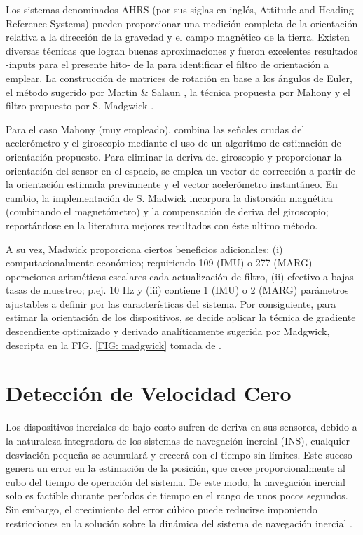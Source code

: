Los sistemas denominados \gls{AHRS} (por sus siglas en inglés, Attitude and Heading Reference Systems) pueden proporcionar una medición completa de la orientación relativa a la dirección de la gravedad y el campo magnético de la tierra. Existen diversas técnicas que logran buenas aproximaciones y fueron excelentes resultados -inputs para el presente hito- de la  para identificar el filtro de orientación a emplear. La construcción de matrices de rotación en base a los ángulos de Euler, el método sugerido por Martin \& Salaun \cite{Martin2010}, la técnica propuesta por Mahony \cite{Mahony2006} y el filtro propuesto por S. Madgwick \cite{Madgwick}.

Para el caso Mahony (muy empleado), combina las señales crudas del acelerómetro y el giroscopio mediante el uso de un algoritmo de estimación de orientación propuesto. Para eliminar la deriva del giroscopio y proporcionar la orientación del sensor en el espacio, se emplea un vector de corrección a partir de la orientación  estimada previamente y el vector acelerómetro instantáneo. En cambio, la implementación de S. Madwick incorpora la distorsión magnética (combinando el magnetómetro) y la compensación de deriva del giroscopio; reportándose en la literatura mejores resultados con éste ultimo método. 

A su vez, Madwick proporciona ciertos beneficios adicionales: (i) computacionalmente económico; requiriendo 109 (IMU) o 277 (MARG) operaciones aritméticas escalares cada actualización de filtro, (ii) efectivo a bajas tasas de muestreo; p.ej. 10 Hz y (iii) contiene 1 (IMU) o 2 (MARG) parámetros ajustables a definir por las características del sistema. Por consiguiente, para estimar la orientación de los dispositivos, se decide aplicar la técnica de gradiente descendiente optimizado y derivado analíticamente sugerida por Madgwick, descripta en la FIG. \ref{FIG: madgwick} tomada de \cite{Madgwick}.

\section{Detección de Velocidad Cero}

Los dispositivos inerciales de bajo costo sufren de deriva en sus sensores, debido a la naturaleza integradora de los sistemas de navegación inercial (INS), cualquier desviación pequeña se acumulará y crecerá con el tiempo sin límites. Este suceso genera un error en la estimación de la posición, que crece proporcionalmente al cubo del tiempo de operación del sistema. De este modo, la navegación inercial solo es factible durante períodos de tiempo en el rango de unos pocos segundos. Sin embargo, el crecimiento del error cúbico puede reducirse imponiendo restricciones en la solución sobre la dinámica del sistema de navegación inercial \cite{Isaac2009}.

